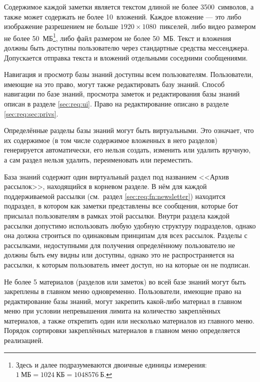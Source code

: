         Содержимое каждой заметки является текстом длиной не более 3500~символов, а также может содержать
        не более 10~вложений. Каждое вложение --- это либо изображение разрешением не больше
        \(1920 \times 1080\)~пикселей, либо видео размером не более 50~МБ\footnote{
            Здесь и далее подразумеваются двоичные единицы измерения: \(1~\text{МБ} = 1024~\text{КБ}
            = 1048576~\text{Б}\).
        }, либо файл размером не более 50~МБ. Текст и вложения должны быть доступны пользователю
        через стандартные средства мессенджера. Допускается отправка текста и вложений
        отдельными соседними сообщениями.

        Навигация и просмотр базы знаний доступны всем пользователям.
        Пользователи, имеющие на это право, могут также редактировать базу знаний.
        Способ навигации по базе знаний, просмотра заметок и редактирования базы знаний
        описан в разделе \ref{sec:req:ui}.
        Право на редактирование описано в разделе
        \ref{sec:req:sec:privs}.

        Определённые разделы базы знаний могут быть виртуальными. Это означает, что их содержимое
        (в том числе содержимое вложенных в него разделов)
        генерируется автоматически, его нельзя создать, изменить или удалить вручную,
        а сам раздел нельзя удалить, переименовать или переместить.

        База знаний содержит один виртуальный раздел под названием <<Архив рассылок>>,
        находящийся в корневом разделе. В нём для каждой поддерживаемой рассылки
        (см.~раздел \ref{sec:req:fn:newsletter}) находится
        подраздел, в котором как заметки представлены все сообщения, которые бот присылал пользователям
        в рамках этой рассылки. Внутри раздела каждой рассылки допустимо использовать любую
        удобную структуру подразделов, однако она должна строиться по одинаковым принципам для всех рассылок.
        Разделы с рассылками, недоступными для получения определённому пользователю не должны быть ему
        видны или доступны, однако это не распространяется на рассылки, к которым пользователь имеет
        доступ, но на которые он не подписан.

        Не более 5 материалов (разделов или заметок) во всей базе знаний могут быть закреплены в
        главном меню одновременно.  Пользователи, имеющие право на редактирование базы знаний,
        могут закрепить какой-либо материал в главном меню при условии непревышения лимита на
        количество закреплённых материалов, а также открепить один или несколько материалов из
        главного меню. Порядок сортировки закреплённых материалов в главном меню определяется
        реализацией.

